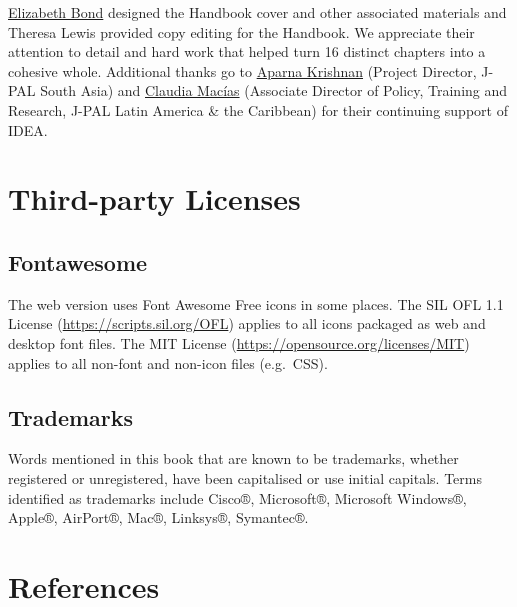 \documentclass[
]{book}
\begin{document}
\href{https://www.povertyactionlab.org/person/bond}{Elizabeth Bond} designed the Handbook cover and other associated materials and Theresa Lewis provided copy editing for the Handbook. We appreciate their attention to detail and hard work that helped turn 16 distinct chapters into a cohesive whole. Additional thanks go to \href{https://www.povertyactionlab.org/person/krishnan}{Aparna Krishnan} (Project Director, J-PAL South Asia) and \href{https://www.povertyactionlab.org/person/macias}{Claudia Macías} (Associate Director of Policy, Training and Research, J-PAL Latin America \& the Caribbean) for their continuing support of IDEA.

\hypertarget{third-party-licenses}{%
\chapter*{Third-party Licenses}\label{third-party-licenses}}

\hypertarget{fontawesome}{%
\section*{Fontawesome}\label{fontawesome}}

The web version uses Font Awesome Free icons in some places.
The SIL OFL 1.1 License (\url{https://scripts.sil.org/OFL}) applies to all icons
packaged as web and desktop font files. The MIT License (\url{https://opensource.org/licenses/MIT}) applies to all non-font and
non-icon files (e.g.~CSS).

\hypertarget{trademarks}{%
\section*{Trademarks}\label{trademarks}}

Words mentioned in this book that are known to be trademarks, whether
registered or unregistered, have been capitalised or use initial
capitals. Terms identified as trademarks include Cisco®, Microsoft®,
Microsoft Windows®, Apple®, AirPort®, Mac®, Linksys®, Symantec®.

\hypertarget{references}{%
\chapter*{References}\label{references}}

  
\end{document}
